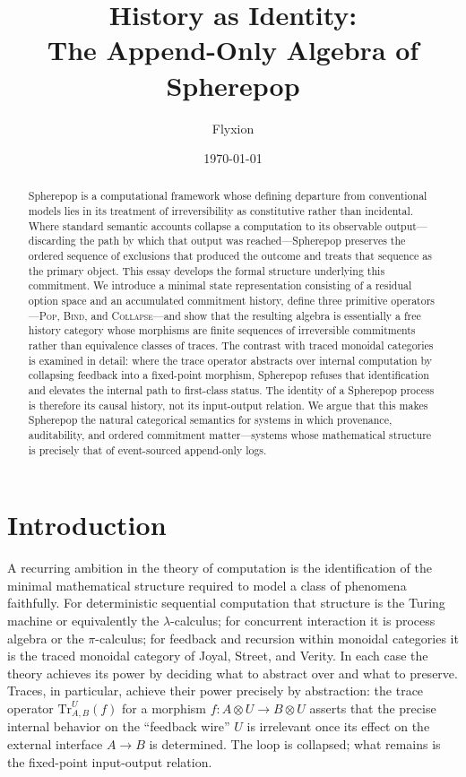 \documentclass[12pt]{article}
\title{History as Identity:\\
The Append-Only Algebra of Spherepop}
\author{Flyxion}
\date{\today}
\begin{document}
\maketitle

\begin{abstract}
Spherepop is a computational framework whose defining departure from conventional models lies in its treatment of irreversibility as constitutive rather than incidental. Where standard semantic accounts collapse a computation to its observable output---discarding the path by which that output was reached---Spherepop preserves the ordered sequence of exclusions that produced the outcome and treats that sequence as the primary object. This essay develops the formal structure underlying this commitment. We introduce a minimal state representation consisting of a residual option space and an accumulated commitment history, define three primitive operators---\textsc{Pop}, \textsc{Bind}, and \textsc{Collapse}---and show that the resulting algebra is essentially a free history category whose morphisms are finite sequences of irreversible commitments rather than equivalence classes of traces. The contrast with traced monoidal categories is examined in detail: where the trace operator abstracts over internal computation by collapsing feedback into a fixed-point morphism, Spherepop refuses that identification and elevates the internal path to first-class status. The identity of a Spherepop process is therefore its causal history, not its input-output relation. We argue that this makes Spherepop the natural categorical semantics for systems in which provenance, auditability, and ordered commitment matter---systems whose mathematical structure is precisely that of event-sourced append-only logs.
\end{abstract}

\newpage
\tableofcontents
\newpage

\section{Introduction}

A recurring ambition in the theory of computation is the identification of the minimal mathematical structure required to model a class of phenomena faithfully. For deterministic sequential computation that structure is the Turing machine or equivalently the $\lambda$-calculus; for concurrent interaction it is process algebra or the $\pi$-calculus; for feedback and recursion within monoidal categories it is the traced monoidal category of Joyal, Street, and Verity. In each case the theory achieves its power by deciding what to abstract over and what to preserve. Traces, in particular, achieve their power precisely by abstraction: the trace operator $\mathrm{Tr}^U_{A,B}(f)$ for a morphism $f : A \otimes U \to B \otimes U$ asserts that the precise internal behavior on the ``feedback wire'' $U$ is irrelevant once its effect on the external interface $A \to B$ is determined. The loop is collapsed; what remains is the fixed-point input-output relation.
\end{document}

